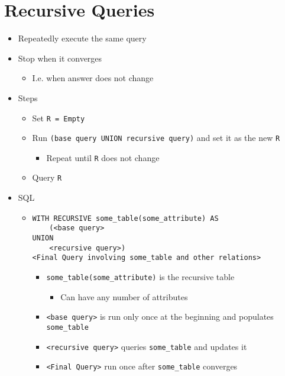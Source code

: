 
\section{Recursive Queries}
\begin{itemize}
    \item Repeatedly execute the same query
    \item Stop when it converges
        \begin{itemize}
            \item I.e. when answer does not change
        \end{itemize}
    \item Steps
        \begin{itemize}
            \item Set \verb+R = Empty+
            \item Run \verb+(base query UNION recursive query)+ and set it as the new \verb+R+
                \begin{itemize}
                    \item Repeat until \verb+R+ does not change
                \end{itemize}
            \item Query \verb+R+
        \end{itemize}
    \item SQL
        \begin{itemize}
            \item
\begin{verbatim}
WITH RECURSIVE some_table(some_attribute) AS
    (<base query>
UNION
    <recursive query>)
<Final Query involving some_table and other relations>
\end{verbatim}
                \begin{itemize}
                    \item \verb+some_table(some_attribute)+ is the recursive table
                        \begin{itemize}
                            \item Can have any number of attributes
                        \end{itemize}
                    \item \verb+<base query>+ is run only once at the beginning and populates \verb+some_table+
                    \item \verb+<recursive query>+ queries \verb+some_table+ and updates it
                    \item \verb+<Final Query>+ run once after \verb+some_table+ converges

\end{itemize}
\end{itemize}
\end{itemize}

